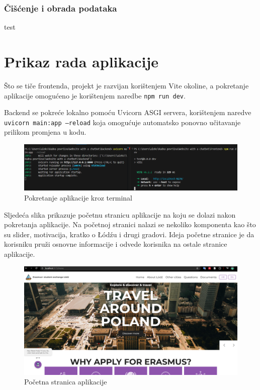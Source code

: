 \documentclass[]{foi}
\begin{document}
\subsubsection{Čišćenje i obrada podataka}
test




\newpage
\section{Prikaz rada aplikacije}

Što se tiče frontenda, projekt je razvijan korištenjem Vite okoline, a pokretanje aplikacije omogućeno je korištenjem naredbe \texttt{npm run dev}.

Backend se pokreće lokalno pomoću Uvicorn ASGI servera, korištenjem naredve \texttt{uvicorn main:app --reload} koja omogućuje automatsko
ponovno učitavanje prilikom promjena u kodu.

\begin{figure}[ht]
  \centering
  \includegraphics[width=1\textwidth]{./assets/pokretanje.png}
  \caption{Pokretanje aplikacije kroz terminal}
  \label{fig:slika93}
\end{figure}

Sljedeća slika prikazuje početnu stranicu aplikacije na koju se dolazi nakon pokretanja aplikacije. Na početnoj stranici nalazi se nekoliko
komponenta kao što su slider, motivacija, kratko o Łódźu i drugi gradovi. Ideja početne stranice je da korisniku pruži osnovne informacije i odvede
korisnika na ostale stranice aplikacije.

\begin{figure}[ht]
  \centering
  \includegraphics[width=1\textwidth]{./assets/Home.png}
  \caption{Početna stranica aplikacije}
  \label{fig:slika94}
\end{figure}
\end{document}

